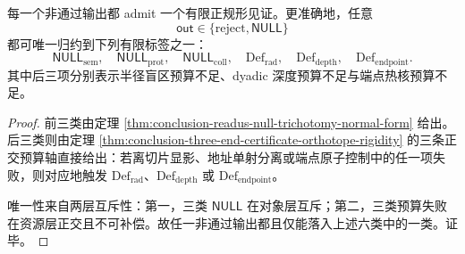 \begin{corollary}\label{cor:conclusion-reject-null-finite-normal-form}
每一个非通过输出都 admit 一个有限正规形见证。更准确地，任意
\[
\mathsf{out}\in\{\mathrm{reject},\mathsf{NULL}\}
\]
都可唯一归约到下列有限标签之一：
\[
\mathsf{NULL}_{\mathrm{sem}},
\quad
\mathsf{NULL}_{\mathrm{prot}},
\quad
\mathsf{NULL}_{\mathrm{coll}},
\quad
\mathrm{Def}_{\mathrm{rad}},
\quad
\mathrm{Def}_{\mathrm{depth}},
\quad
\mathrm{Def}_{\mathrm{endpoint}}.
\]
其中后三项分别表示半径盲区预算不足、dyadic 深度预算不足与端点热核预算不足。
\end{corollary}
\begin{proof}
前三类由定理 \ref{thm:conclusion-readus-null-trichotomy-normal-form} 给出。后三类则由定理 \ref{thm:conclusion-three-end-certificate-orthotope-rigidity} 的三条正交预算轴直接给出：若离切片显影、地址单射分离或端点原子控制中的任一项失败，则对应地触发 \(\mathrm{Def}_{\mathrm{rad}}\)、\(\mathrm{Def}_{\mathrm{depth}}\) 或 \(\mathrm{Def}_{\mathrm{endpoint}}\)。

唯一性来自两层互斥性：第一，三类 \(\mathsf{NULL}\) 在对象层互斥；第二，三类预算失败在资源层正交且不可补偿。故任一非通过输出都且仅能落入上述六类中的一类。证毕。
\end{proof}
